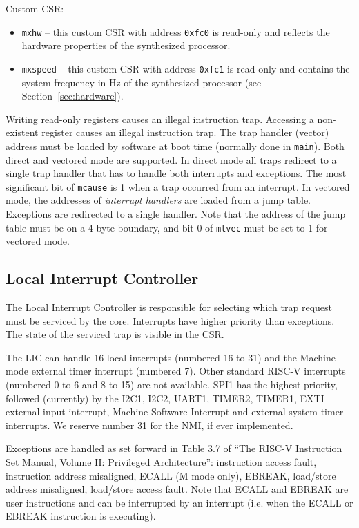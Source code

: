 \documentclass[12pt]{article}
\begin{document}
Custom CSR:

\begin{itemize}
\item \lstinline|mxhw| -- this custom CSR with address \lstinline|0xfc0| is read-only and reflects the hardware properties of the synthesized processor.
\item \lstinline|mxspeed| -- this custom CSR with address \lstinline|0xfc1| is read-only and contains the system frequency in Hz of the synthesized processor (see Section~\ref{sec:hardware}).
\end{itemize}

Writing read-only registers causes an illegal instruction trap. Accessing a non-existent register causes an illegal instruction trap. The trap handler (vector) address must be loaded by software at boot time (normally done in \lstinline|main|). Both direct and vectored mode are supported. In direct mode all traps redirect to a single trap handler that has to handle both interrupts and exceptions. The most significant bit of \lstinline|mcause| is 1 when a trap occurred from an interrupt. In vectored mode, the addresses of \emph{interrupt handlers} are loaded from a jump table. Exceptions are redirected to a single handler. Note that the address of the jump table must be on a 4-byte boundary, and bit 0 of \lstinline|mtvec| must be set to 1 for vectored mode.


\subsection{Local Interrupt Controller}
The Local Interrupt Controller is responsible for selecting which trap request must be serviced by the core. Interrupts have higher priority than exceptions. The state of the serviced trap is visible in the CSR.

The LIC can handle 16 local interrupts (numbered 16 to 31) and the Machine mode external timer interrupt (numbered 7). Other standard RISC-V interrupts (numbered 0 to 6 and 8 to 15) are not available. SPI1 has the highest priority, followed (currently) by the I2C1, I2C2, UART1, TIMER2, TIMER1, EXTI external input interrupt, Machine Software Interrupt and external system timer interrupts. We reserve number 31 for the NMI, if ever implemented.

Exceptions are handled as set forward in Table 3.7 of ``The RISC-V Instruction Set Manual, Volume II: Privileged Architecture'': instruction access fault, instruction address misaligned, ECALL (M mode only), EBREAK, load/store address misaligned, load/store access fault. Note that ECALL and EBREAK are user instructions and can be interrupted by an interrupt (i.e. when the ECALL or EBREAK instruction is executing).
\end{document}
